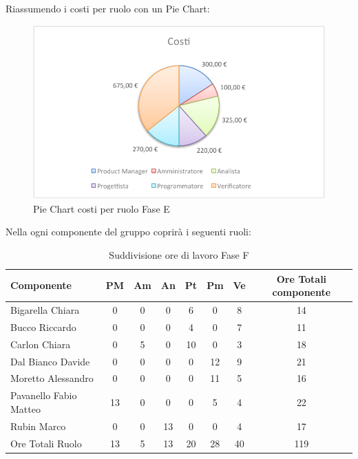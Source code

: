 				Riassumendo i costi per ruolo con un Pie Chart:
				\begin{figure}[H]\centering
					\includegraphics[width=\textwidth]{PianoDiProgetto/Pics/ChartTotCostiFaseE.pdf}
					\caption{Pie Chart costi per ruolo Fase E}
				\end{figure}
				Nella  ogni componente del gruppo \groupname{} coprirà i seguenti ruoli:
				\begin{table}[H]
					\begin{center}
						\begin{tabular}{| l | c | c | c | c | c | c | c |}
							\hline
							Componente 				& PM	& Am 	& An 	& Pt 		& Pm 	& Ve 	& Ore Totali componente \\ \hline
							
							Bigarella Chiara 			& 0		& 0		& 0		& 6 		& 0		& 8 		& 14 \\
							Bucco Riccardo 			& 0		& 0		& 0		& 4 		& 0		& 7 		& 11 \\
							Carlon Chiara	 			& 0		& 5 		& 0		& 10 		& 0		& 3 		& 18 \\
							Dal Bianco Davide 			& 0		& 0		& 0		& 0		& 12 		& 9 		& 21 \\
							Moretto Alessandro 			& 0		& 0		& 0		& 0		& 11 		& 5		& 16 \\
							Pavanello Fabio Matteo	 	& 13 		& 0		& 0		& 0		& 5 		& 4 		& 22 \\
							Rubin Marco				& 0		& 0		& 13 		& 0		& 0		& 4 		& 17 \\ \hline \hline
							
							Ore Totali Ruolo 			& 13 		& 5 		& 13 		& 20 		& 28 		& 40 		& 119\\ \hline
						\end{tabular}
					\end{center}
					\caption{Suddivisione ore di lavoro Fase F}
				\end{table}
